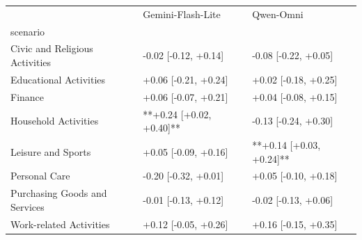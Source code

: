\begin{tabular}{lll}
\toprule
 & Gemini-Flash-Lite & Qwen-Omni \\
scenario &  &  \\
\midrule
Civic and Religious Activities & -0.02 [-0.12, +0.14] & -0.08 [-0.22, +0.05] \\
Educational Activities & +0.06 [-0.21, +0.24] & +0.02 [-0.18, +0.25] \\
Finance & +0.06 [-0.07, +0.21] & +0.04 [-0.08, +0.15] \\
Household Activities & **+0.24 [+0.02, +0.40]** & -0.13 [-0.24, +0.30] \\
Leisure and Sports & +0.05 [-0.09, +0.16] & **+0.14 [+0.03, +0.24]** \\
Personal Care & -0.20 [-0.32, +0.01] & +0.05 [-0.10, +0.18] \\
Purchasing Goods and Services & -0.01 [-0.13, +0.12] & -0.02 [-0.13, +0.06] \\
Work-related Activities & +0.12 [-0.05, +0.26] & +0.16 [-0.15, +0.35] \\
\bottomrule
\end{tabular}
